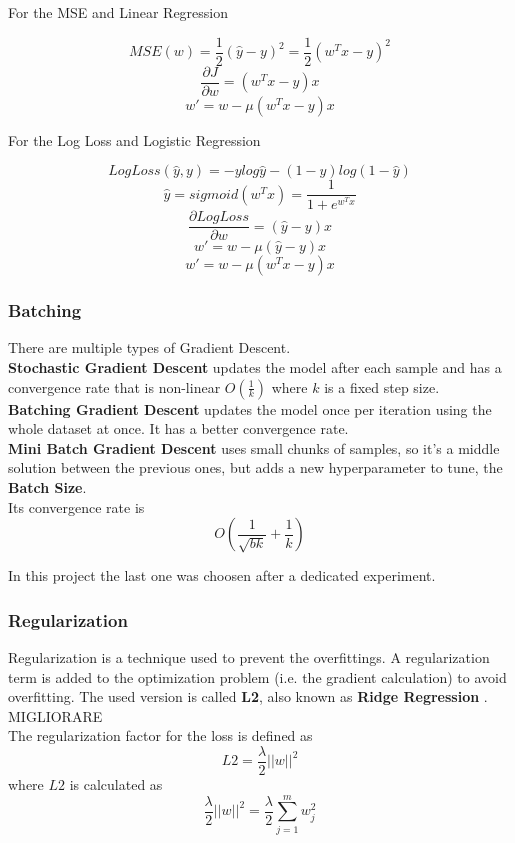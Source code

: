 \documentclass[
	letterpaper, %
	10pt, %
]{class}
\begin{document}
For the MSE and Linear Regression

$$ MSE(w) = \frac{1}{2} (\hat{y} - y)^2 = \frac{1}{2} (w^Tx - y)^2 $$
$$\frac{\partial J}{\partial w} = (w^T x - y)x $$
$$ w' = w - \mu (w^T x -y)x $$

For the Log Loss and Logistic Regression

$$ LogLoss(\hat{y}, y) = -y log \hat{y} - (1-y)log(1- \hat{y})$$
$$ \hat{y} = sigmoid(w^Tx) = \frac{1}{1 + e^{w^Tx}} $$
$$ \frac{\partial LogLoss}{\partial w} = (\hat{y} - y)x $$
$$ w' = w - \mu (\hat{y} - y)x $$
$$ w' = w - \mu (w^T x -y)x $$

\subsubsection{Batching}
There are multiple types of Gradient Descent.\\

\textbf{Stochastic Gradient Descent} updates the model after each sample and has a convergence rate that is non-linear $O(\frac{1}{k})$ where $k$ is a fixed step size.\\

\textbf{Batching Gradient Descent} updates the model once per iteration using the whole dataset at once. It has a better convergence rate.\\

\textbf{Mini Batch Gradient Descent} \cite{batching} uses small chunks of samples, so it's a middle solution between the previous ones, but adds a new hyperparameter to tune, the \textbf{Batch Size}.\\
Its convergence rate is
$$O(\frac{1}{\sqrt{bk}} + \frac{1}{k})$$

In this project the last one was choosen after a dedicated experiment.

\subsubsection{Regularization}
Regularization is a technique used to prevent the overfittings. A regularization term is added to the optimization problem (i.e. the gradient calculation) to avoid overfitting.
The used version is called \textbf{L2}, also known as \textbf{Ridge Regression} \cite{l2}. MIGLIORARE\\

The regularization factor for the loss is defined as
$$ L2 = \frac{\lambda}{2}||w||^2 $$
where $L2$ is calculated as
$$ \frac{\lambda}{2}||w||^2 = \frac{\lambda}2{\displaystyle\sum_{j=1}^m w_j^2} $$ \\
\end{document}
